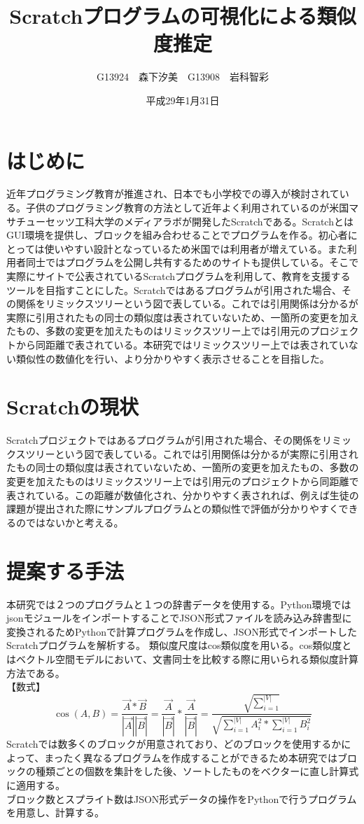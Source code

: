 \documentclass[twocolumn,9pt,a4paper]{jsarticle}
\title{Scratchプログラムの可視化による類似度推定}
\author{G13924　森下汐美　G13908　岩科智彩}
\date{平成29年1月31日}
\begin{document}
\maketitle
%
%
\section{はじめに}
近年プログラミング教育が推進され、日本でも小学校での導入が検討されている。子供のプログラミング教育の方法として近年よく利用されているのが米国マサチューセッツ工科大学のメディアラボが開発したScratchである。ScratchとはGUI環境を提供し、ブロックを組み合わせることでプログラムを作る。初心者にとっては使いやすい設計となっているため米国では利用者が増えている。また利用者同士ではプログラムを公開し共有するためのサイトも提供している。そこで実際にサイトで公表されているScratchプログラムを利用して、教育を支援するツールを目指すことにした。Scratchではあるプログラムが引用された場合、その関係をリミックスツリーという図で表している。これでは引用関係は分かるが実際に引用されたもの同士の類似度は表されていないため、一箇所の変更を加えたもの、多数の変更を加えたものはリミックスツリー上では引用元のプロジェクトから同距離で表されている。本研究ではリミックスツリー上では表されていない類似性の数値化を行い、より分かりやすく表示させることを目指した。
\section{Scratchの現状}
Scratchプロジェクトではあるプログラムが引用された場合、その関係をリミックスツリーという図で表している。これでは引用関係は分かるが実際に引用されたもの同士の類似度は表されていないため、一箇所の変更を加えたもの、多数の変更を加えたものはリミックスツリー上では引用元のプロジェクトから同距離で表されている。この距離が数値化され、分かりやすく表されれば、例えば生徒の課題が提出された際にサンプルプログラムとの類似性で評価が分かりやすくできるのではないかと考える。
\section{提案する手法}
本研究では２つのプログラムと１つの辞書データを使用する。Python環境ではjsonモジュールをインポートすることでJSON形式ファイルを読み込み辞書型に変換されるためPythonで計算プログラムを作成し、JSON形式でインポートしたScratchプログラムを解析する。
類似度尺度はcos類似度を用いる。cos類似度とはベクトル空間モデルにおいて、文書同士を比較する際に用いられる類似度計算方法である。
\\【数式】
\begin{equation}
\cos(A,B) = \frac{\vec{A} \ast\vec{B}} {|\vec{A}||\vec{B}|}  = \frac{\vec{A}}{|\vec{B}|}\ast\frac{\vec{A}}{|\vec{B}|} = \frac{\sqrt {\sum_{i=1}^{|V|}}}{\sqrt{\sum_{i=1}^{|V|}A_i^2\ast\sum_{i=1}^{|V|}B_i^2}}
\end{equation}
Scratchでは数多くのブロックが用意されており、どのブロックを使用するかによって、まったく異なるプログラムを作成することができるため本研究ではブロックの種類ごとの個数を集計をした後、ソートしたものをベクターに直し計算式に適用する。
\\ブロック数とスプライト数はJSON形式データの操作をPythonで行うプログラムを用意し、計算する。
\end{document}
